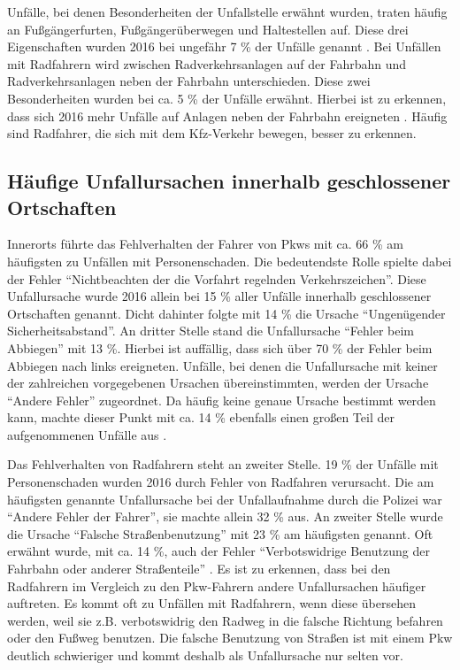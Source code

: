 Unfälle, bei denen Besonderheiten der Unfallstelle erwähnt wurden, traten häufig an Fußgängerfurten, Fußgängerüberwegen und Haltestellen auf. Diese drei Eigenschaften wurden 2016 bei ungefähr 7 \% der Unfälle genannt \parencite[S. 88]{StatistischesBundesamt.2017}. Bei Unfällen mit Radfahrern wird zwischen Radverkehrsanlagen auf der Fahrbahn und Radverkehrsanlagen neben der Fahrbahn unterschieden. Diese zwei Besonderheiten wurden bei ca. 5 \% der Unfälle erwähnt. Hierbei ist zu erkennen, dass sich 2016 mehr Unfälle auf Anlagen neben der Fahrbahn ereigneten \parencite[S. 88]{StatistischesBundesamt.2017}. Häufig sind Radfahrer, die sich mit dem Kfz-Verkehr bewegen, besser zu erkennen. %

\subsection{Häufige Unfallursachen innerhalb geschlossener Ortschaften}\label{chapter:Unfallursachen innerorts}
Innerorts führte das Fehlverhalten der Fahrer von Pkws mit ca. 66 \% am häufigsten zu Unfällen mit Personenschaden. Die bedeutendste Rolle spielte dabei der Fehler \enquote{Nichtbeachten der die Vorfahrt regelnden Verkehrszeichen}. Diese Unfallursache wurde 2016 allein bei 15 \% aller Unfälle innerhalb geschlossener Ortschaften genannt. Dicht dahinter folgte mit 14 \% die Ursache \enquote{Ungenügender Sicherheitsabstand}. An dritter Stelle stand die Unfallursache \enquote{Fehler beim Abbiegen} mit 13 \%. Hierbei ist auffällig, dass sich über 70 \% der Fehler beim Abbiegen nach links ereigneten.
Unfälle, bei denen die Unfallursache mit keiner der zahlreichen vorgegebenen Ursachen übereinstimmten, werden der Ursache \enquote{Andere Fehler} zugeordnet. Da häufig keine genaue Ursache bestimmt werden kann, machte dieser Punkt mit ca. 14 \% ebenfalls einen großen Teil der aufgenommenen Unfälle aus \parencite[S. 274-277]{StatistischesBundesamt.2018b}.

Das Fehlverhalten von Radfahrern steht an zweiter Stelle. 19 \% der Unfälle mit Personenschaden wurden 2016 durch Fehler von Radfahren verursacht. Die am häufigsten genannte Unfallursache bei der Unfallaufnahme durch die Polizei war \enquote{Andere Fehler der Fahrer}, sie machte allein 32 \% aus. An zweiter Stelle wurde die Ursache \enquote{Falsche Straßenbenutzung} mit 23 \% am häufigsten genannt. Oft erwähnt wurde, mit ca. 14 \%, auch der Fehler \enquote{Verbotswidrige Benutzung der Fahrbahn oder anderer Straßenteile} \parencite[S. 274-277]{StatistischesBundesamt.2018b}. Es ist zu erkennen, dass bei den Radfahrern im Vergleich zu den Pkw-Fahrern andere Unfallursachen häufiger auftreten. Es kommt oft zu Unfällen mit Radfahrern, wenn diese übersehen werden, weil sie z.B. verbotswidrig den Radweg in die falsche Richtung befahren oder den Fußweg benutzen. Die falsche Benutzung von Straßen ist mit einem Pkw deutlich schwieriger und kommt deshalb als Unfallursache nur selten vor.

